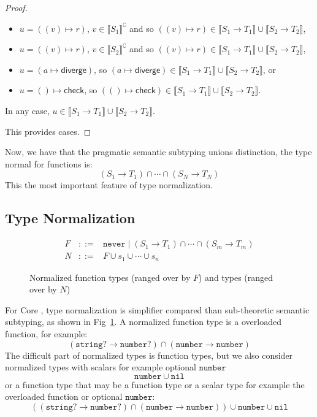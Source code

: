 \documentclass[acmsmall,review,screen]{acmart}
\newcommand{\NEVER}{\mathtt{never}}
\newcommand{\NIL}{\mathtt{nil}}
\newcommand{\NUMBER}{\mathtt{number}}
\newcommand{\STRING}{\mathtt{string}}
\newcommand{\DIVERGE}{\mathsf{diverge}}
\newcommand{\CHECK}{\mathsf{check}}
\newcommand{\fun}{\mathbin{\rightarrow}}
\newcommand{\sem}[1]{\llbracket{#1}\rrbracket}
\newcommand{\nsem}[1]{\llbracket{#1}\rrbracket^\complement}
\begin{document}
\begin{proof}
\begin{enumerate}
\begin{itemize}
  \item $u = ((v) \mapsto r)$, $v \in \nsem{S_1}$
    and so $((v) \mapsto r) \in  \sem{S_1 \fun T_1} \cup \sem{S_2 \fun T_2}$,

  \item $u = ((v) \mapsto r)$, $v \in \nsem{S_2}$
    and so $((v) \mapsto r) \in \sem{S_1 \fun T_1} \cup \sem{S_2 \fun T_2}$,
    
  \item $u = (a \mapsto \DIVERGE)$, so $(a \mapsto \DIVERGE) \in \sem{S_1 \fun T_1} \cup \sem{S_2 \fun T_2}$, or
    
  \item $u = () \mapsto \CHECK$, so $(() \mapsto \CHECK) \in \sem{S_1 \fun T_1} \cup \sem{S_2 \fun T_2}$.

  \end{itemize}
  In any case, $u \in \sem{S_1 \fun T_1} \cup \sem{S_2 \fun T_2}$.

  \end{enumerate}
  This provides cases.
\end{proof}

Now, we have that the  pragmatic semantic subtyping unions distinction,
the type normal for functions is:
\[
  (S_1 \fun T_1) \cap \cdots \cap (S_N \fun T_N)  
\] 
This the most important feature of type normalization.

\subsection{Type Normalization}
\label{subsec:typnorm}

\begin{figure}
  
\[\begin{array}{rcl}
  F & ::= & \NEVER \mid (S_1 \fun T_1) \cap \cdots \cap (S_m \fun T_m) \\
  N & ::= & F \cup s_1 \cup \cdots \cup s_n
\end{array}\]
\caption{Normalized function types (ranged over by $F$) and types (ranged over by $N$)}
\label{fig:ntypes}

\end{figure}

For Core , type normalization is simplifier compared than sub-theoretic semantic subtyping,
as shown in Fig~\ref{fig:ntypes}. A normalized function type is a overloaded function, for example:
\[
  (\STRING? \fun \NUMBER?) \cap (\NUMBER \fun \NUMBER)
\]
The difficult part of normalized types is function types, but we also consider normalized types with scalars
for example optional $\NUMBER$
\[
  \NUMBER \cup \NIL
\]
or a function type that may be a function type or a scalar type for example
the overloaded function or optional $\NUMBER$:
\[
  ((\STRING? \fun \NUMBER?) \cap (\NUMBER \fun \NUMBER)) \cup \NUMBER \cup \NIL
\]
\end{document}

